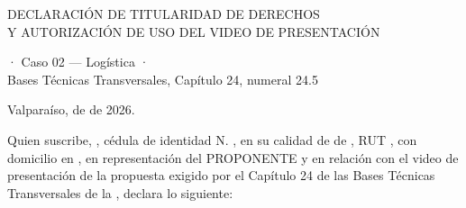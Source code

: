 \documentclass[carta,firma,final]{lafrox}
\newcommand{\campo}[1]{\underline{\makebox[#1]{}}}
\begin{document}

\begin{center}
  {\intersemibold\fontsize{16pt}{20pt}\selectfont\color{lafroxFuerte}
   DECLARACIÓN DE TITULARIDAD DE DERECHOS\\ Y AUTORIZACIÓN DE USO DEL VIDEO DE PRESENTACIÓN\par}
  \vspace{3pt}
  {\intermedium\fontsize{10pt}{13pt}\selectfont\color{lafroxGris}
   \LFXlicitacion{} · Caso 02 — Logística · \LFXcliente\\
   Bases Técnicas Transversales, Capítulo 24, numeral 24.5\par}
\end{center}

\vspace{4pt}
\noindent Valparaíso, \campo{1.2cm} de \campo{3.2cm} de 2026.

\vspace{4pt}
\noindent Quien suscribe, \textbf{\LFXrepresentante}, cédula de identidad N.\textdegree{} \campo{3.2cm},
en su calidad de \textbf{\LFXcargo} de \textbf{\LFXempresa}, RUT \LFXrut, con domicilio en \LFXdomicilio,
en representación del PROPONENTE y en relación con el video de presentación de la propuesta exigido por el
Capítulo 24 de las Bases Técnicas Transversales de la \LFXlicitacion, declara lo siguiente:
\end{document}
